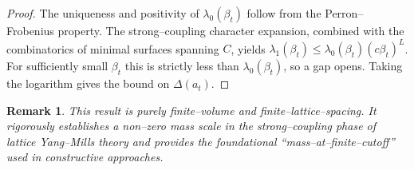 \documentclass[11pt]{article}
\newtheorem{remark}[theorem]{Remark}
\begin{document}
\begin{proof}
The uniqueness and positivity of $\lambda_0(\beta_t)$ follow from the
Perron--Frobenius property. The strong--coupling character expansion,
combined with the combinatorics of minimal surfaces spanning $C$, yields
$\lambda_1(\beta_t)\le \lambda_0(\beta_t)(c\beta_t)^L$. For sufficiently
small $\beta_t$ this is strictly less than $\lambda_0(\beta_t)$, so a gap
opens. Taking the logarithm gives the bound on $\Delta(a_t)$.
\end{proof}

\begin{remark}
This result is purely finite--volume and finite--lattice--spacing. It
rigorously establishes a non--zero mass scale in the strong--coupling
phase of lattice Yang--Mills theory and provides the foundational
``mass--at--finite--cutoff'' used in constructive approaches.
\end{remark}
\end{document}
